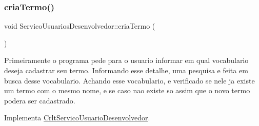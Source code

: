 \mbox{\label{class_servico_usuarios_desenvolvedor_ab378812b1e6b4d648fb8860cf8444210}} 
\subsubsection{\texorpdfstring{cria\+Termo()}{criaTermo()}}
{\footnotesize\ttfamily void Servico\+Usuarios\+Desenvolvedor\+::cria\+Termo (\begin{DoxyParamCaption}{ }\end{DoxyParamCaption})\hspace{0.3cm}{\ttfamily [virtual]}}

Primeiramente o programa pede para o usuario informar em qual vocabulario deseja cadastrar seu termo. Informando esse detalhe, uma pesquisa e feita em busca desse vocabulario. Achando esse vocabulario, e verificado se nele ja existe um termo com o mesmo nome, e se caso nao existe so assim que o novo termo podera ser cadastrado.

Implementa \mbox{\hyperlink{class_crlt_servico_usuario_desenvolvedor_a924f7dcd059d8ff265909d29457a961b}{Crlt\+Servico\+Usuario\+Desenvolvedor}}.


